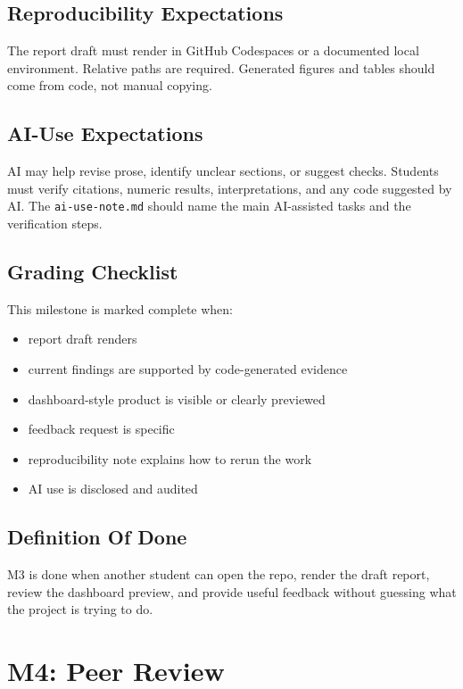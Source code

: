 \documentclass[
  letterpaper,
  DIV=11,
  numbers=noendperiod,
  oneside]{scrreprt}
\providecommand{\tightlist}{%
  \setlength{\itemsep}{0pt}\setlength{\parskip}{0pt}}
\begin{document}
\section{Reproducibility
Expectations}\label{reproducibility-expectations-5}

The report draft must render in GitHub Codespaces or a documented local
environment. Relative paths are required. Generated figures and tables
should come from code, not manual copying.

\section{AI-Use Expectations}\label{ai-use-expectations-4}

AI may help revise prose, identify unclear sections, or suggest checks.
Students must verify citations, numeric results, interpretations, and
any code suggested by AI. The \texttt{ai-use-note.md} should name the
main AI-assisted tasks and the verification steps.

\section{Grading Checklist}\label{grading-checklist-3}

This milestone is marked complete when:

\begin{itemize}
\tightlist
\item
  report draft renders
\item
  current findings are supported by code-generated evidence
\item
  dashboard-style product is visible or clearly previewed
\item
  feedback request is specific
\item
  reproducibility note explains how to rerun the work
\item
  AI use is disclosed and audited
\end{itemize}

\section{Definition Of Done}\label{definition-of-done-6}

M3 is done when another student can open the repo, render the draft
report, review the dashboard preview, and provide useful feedback
without guessing what the project is trying to do.

\chapter{M4: Peer Review}\label{m4-peer-review}
\end{document}

